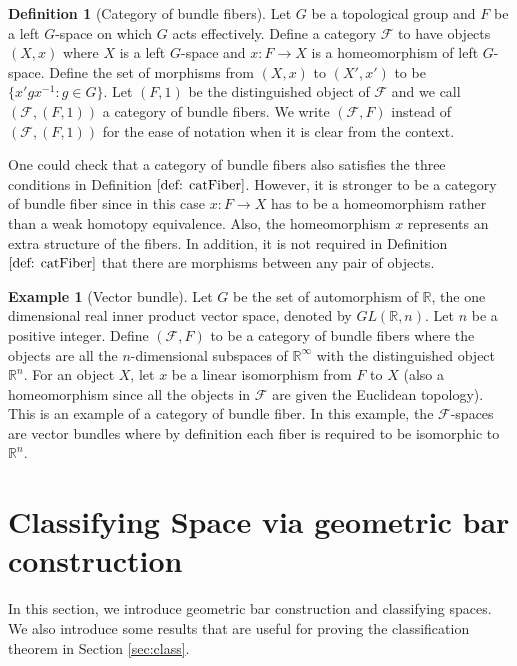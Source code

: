 \documentclass[psamsfonts]{amsart}
\theoremstyle{definition}
\newtheorem{defn}[thm]{Definition}
\newtheorem{exmp}[thm]{Example}
\theoremstyle{remark}
\numberwithin{equation}{section}
\begin{document}
\begin{defn}[Category of bundle fibers]
Let $G$ be a topological group and $F$ be a left $G$-space on which $G$ acts effectively. Define a category $\mathcal{F}$ to have objects $(X, x)$ where $X$ is a left $G$-space and $x: F \to X$ is a homeomorphism of left $G$-space. Define the set of morphisms from $(X, x)$ to $(X', x')$ to be $\{x'gx^{-1}: g \in G\}$. Let $(F, 1)$ be the distinguished object of $\mathcal{F}$ and we call $(\mathcal{F}, (F, 1))$ a category of bundle fibers. We write $(\mathcal{F}, F)$ instead of $(\mathcal{F}, (F, 1))$ for the ease of notation when it is clear from the context.
\end{defn}

One could check that a category of bundle fibers also satisfies the three conditions in Definition $\ref{def: catFiber}$. However, it is stronger to be a category of bundle fiber since in this case $x: F \to X$ has to be a homeomorphism rather than a weak homotopy equivalence. Also, the homeomorphism $x$ represents an extra structure of the fibers. In addition, it is not required in Definition $\ref{def: catFiber}$ that there are morphisms between any pair of objects.

\begin{exmp}[Vector bundle]
Let $G$ be the set of automorphism of $\mathbb{R}$, the one dimensional real inner product vector space, denoted by $GL(\mathbb{R}, n)$. Let $n$ be a positive integer. Define $(\mathcal{F}, F)$ to be a category of bundle fibers where the objects are all the $n$-dimensional subspaces of $\mathbb{R}^{\infty}$ with the distinguished object $\mathbb{R}^{n}$. For an object $X$, let $x$ be a linear isomorphism from $F$ to $X$ (also a homeomorphism since all the objects in $\mathcal{F}$ are given the Euclidean topology). This is an example of a category of bundle fiber. In this example, the $\mathcal{F}$-spaces are vector bundles where by definition each fiber is required to be isomorphic to $\mathbb{R}^{n}$.
\end{exmp}






\section{Classifying Space via geometric bar construction}
In this section, we introduce geometric bar construction and classifying spaces. We also introduce some results that are useful for proving the classification theorem in Section \ref{sec:class}.
\end{document}
